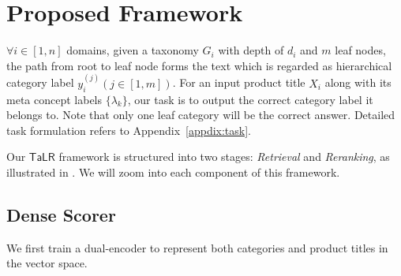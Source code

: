 \section{Proposed Framework}

$\forall i \in [1,n]$ domains, given a taxonomy $G_i$ with depth of $d_i$ and $m$ leaf nodes, the path from root to leaf node forms the text which is regarded as hierarchical category label $y_i^{(j)}(j\in [1,m])$. For an input product title $X_i$ along with its meta concept labels $\{\lambda_k\}$, our task is to 
output the correct category label it belongs to. Note that only one leaf category will be the correct answer.
Detailed task formulation refers to Appendix~\ref{appdix:task}.

Our $\mathsf{TaLR}$ framework is structured into two stages: \textit{Retrieval} and \textit{Reranking}, as illustrated in .
We will zoom into each component of this framework.

\subsection{Dense Scorer}
We first train a dual-encoder to represent both categories and product titles in the vector space. 
